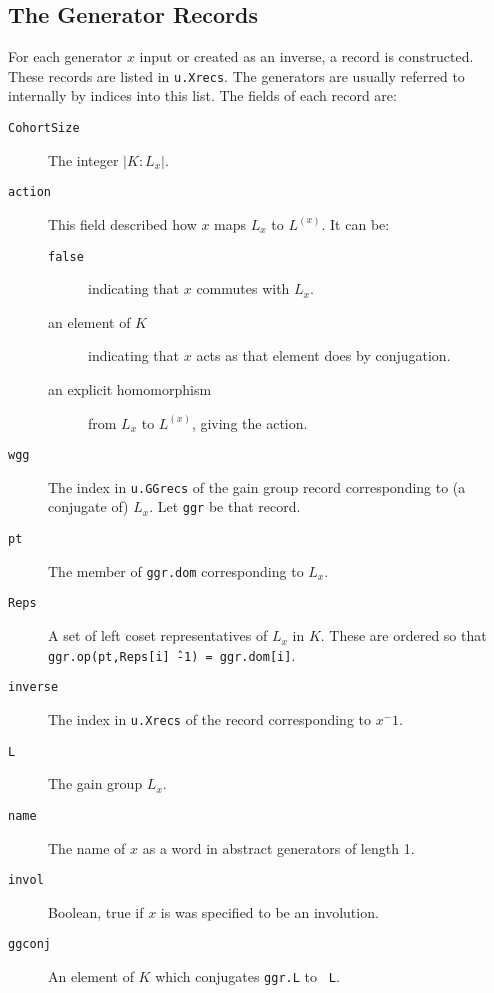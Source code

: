 \subsection{The Generator Records}
For each generator $x$ input or created as an inverse, a record is
constructed. These records are listed in {\tt u.Xrecs}. The generators
are usually referred to internally by indices into this list. The fields of
each record are:
\begin{description}
\item[\tt CohortSize] The integer $|K:L_x|$.
\item[\tt action] This field described how $x$ maps $L_x$ to $L^{(x)}$. It
can be:
\begin{description}
\item[\tt false] indicating that $x$ commutes with $L_x$.
\item[an element of $K$] indicating that $x$ acts as that element does
by conjugation.
\item[an explicit homomorphism] from $L_x$ to $L^{(x)}$, giving the
action.
\end{description}
\item[\tt wgg] The index in {\tt u.GGrecs} of the gain group record
corresponding to (a conjugate of) $L_x$. Let {\tt ggr} be that record.
\item[\tt pt] The member of {\tt ggr.dom} corresponding to $L_x$.
\item[\tt Reps] A set of left coset representatives of $L_x$ in $K$. These
are ordered so that {\tt ggr.op(pt,Reps[i]\^\ -1) = ggr.dom[i]}.
\item[\tt inverse] The index in {\tt u.Xrecs} of the record corresponding
to $x^-1$.
\item[\tt L] The gain group $L_x$.
\item[\tt name] The name of $x$ as a word in abstract generators of length
1.
\item[\tt invol] Boolean, true if $x$ is was specified to be an involution.
\item[\tt ggconj] An element of $K$ which conjugates {\tt ggr.L} to {\tt
L}.
\end{description} 

